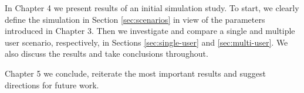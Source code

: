 In Chapter 4 we present results of an initial simulation study. To start, we clearly define the simulation in Section \ref{sec:scenarios} in view of the parameters introduced in Chapter 3. Then we investigate and compare a single and multiple user scenario, respectively, in Sections \ref{sec:single-user} and \ref{sec:multi-user}. We also discuss the results and take conclusions throughout.

Chapter 5 we conclude, reiterate the most important results and suggest directions for future work.